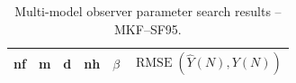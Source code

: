 \begin{table}[hb]
	\begin{center}
		\caption{Multi-model observer parameter search results – MKF--SF95.} \label{tb:obs-sim2-popt-SF95}
		\begin{tabular}{p{}>{\centering\arraybackslash}p{}>{\centering\arraybackslash}p{}>{\centering\arraybackslash}p{}>{\centering\arraybackslash}p{}>{\centering\arraybackslash}p{}}
			\gls{nf} & \gls{m}  & \gls{d}  & \gls{nh} & $\beta$ & $\operatorname{RMSE}(\hat{Y}(N),Y(N))$  \\
			\hline

\end{tabular}
\end{center}
\end{table}
